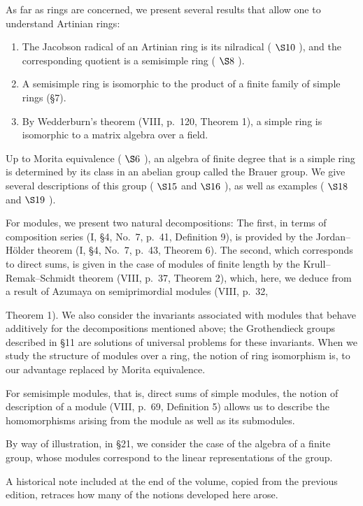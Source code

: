 As far as rings are concerned, we present several results that allow one to understand Artinian rings:

\begin{enumerate}
\def\labelenumi{\alph{enumi})}
\item
  The Jacobson radical of an Artinian ring is its nilradical ( \(\S10\) ), and the corresponding quotient is a semisimple ring ( \(\S8\) ).
\item
  A semisimple ring is isomorphic to the product of a finite family of simple rings (§7).
\item
  By Wedderburn's theorem (VIII, p.~120, Theorem 1), a simple ring is isomorphic to a matrix algebra over a field.
\end{enumerate}

Up to Morita equivalence ( \(\S6\) ), an algebra of finite degree that is a simple ring is determined by its class in an abelian group called the Brauer group. We give several descriptions of this group ( \(\S15\) and \(\S16\) ), as well as examples ( \(\S18\) and \(\S19\) ).

For modules, we present two natural decompositions: The first, in terms of composition series (I, §4, No.~7, p.~41, Definition 9), is provided by the Jordan--Hölder theorem (I, §4, No.~7, p.~43, Theorem 6). The second, which corresponds to direct sums, is given in the case of modules of finite length by the Krull--Remak--Schmidt theorem (VIII, p.~37, Theorem 2), which, here, we deduce from a result of Azumaya on semiprimordial modules (VIII, p.~32,

Theorem 1). We also consider the invariants associated with modules that behave additively for the decompositions mentioned above; the Grothendieck groups described in §11 are solutions of universal problems for these invariants. When we study the structure of modules over a ring, the notion of ring isomorphism is, to our advantage replaced by Morita equivalence.

For semisimple modules, that is, direct sums of simple modules, the notion of description of a module (VIII, p.~69, Definition 5) allows us to describe the homomorphisms arising from the module as well as its submodules.

By way of illustration, in §21, we consider the case of the algebra of a finite group, whose modules correspond to the linear representations of the group.

A historical note included at the end of the volume, copied from the previous edition, retraces how many of the notions developed here arose.

